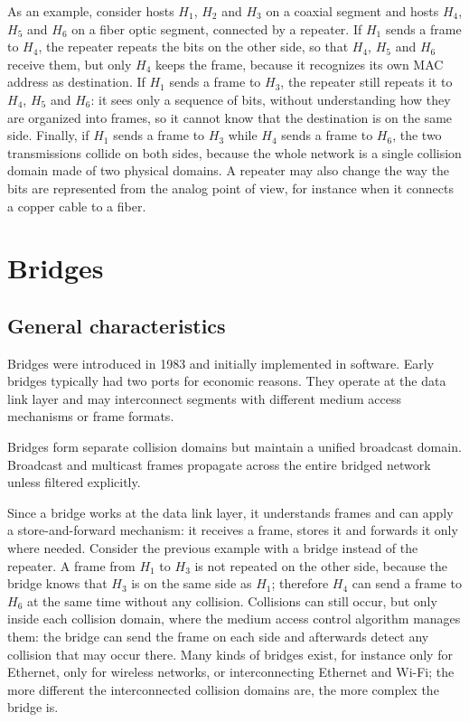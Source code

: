\begin{center}
\end{center}


As an example, consider hosts $H_1$, $H_2$ and $H_3$ on a coaxial segment and hosts $H_4$, $H_5$ and $H_6$ on a fiber optic segment, connected by a repeater. If $H_1$ sends a frame to $H_4$, the repeater repeats the bits on the other side, so that $H_4$, $H_5$ and $H_6$ receive them, but only $H_4$ keeps the frame, because it recognizes its own MAC address as destination. If $H_1$ sends a frame to $H_3$, the repeater still repeats it to $H_4$, $H_5$ and $H_6$: it sees only a sequence of bits, without understanding how they are organized into frames, so it cannot know that the destination is on the same side. Finally, if $H_1$ sends a frame to $H_3$ while $H_4$ sends a frame to $H_6$, the two transmissions collide on both sides, because the whole network is a single collision domain made of two physical domains. A repeater may also change the way the bits are represented from the analog point of view, for instance when it connects a copper cable to a fiber.



\section{Bridges}

\subsection{General characteristics}

Bridges were introduced in 1983 and initially implemented in software. Early bridges typically had two ports for economic reasons. They operate at the data link layer and may interconnect segments with different medium access mechanisms or frame formats.

Bridges form separate collision domains but maintain a unified broadcast domain. Broadcast and multicast frames propagate across the entire bridged network unless filtered explicitly.

Since a bridge works at the data link layer, it understands frames and can apply a store-and-forward mechanism: it receives a frame, stores it and forwards it only where needed. Consider the previous example with a bridge instead of the repeater. A frame from $H_1$ to $H_3$ is not repeated on the other side, because the bridge knows that $H_3$ is on the same side as $H_1$; therefore $H_4$ can send a frame to $H_6$ at the same time without any collision. Collisions can still occur, but only inside each collision domain, where the medium access control algorithm manages them: the bridge can send the frame on each side and afterwards detect any collision that may occur there. Many kinds of bridges exist, for instance only for Ethernet, only for wireless networks, or interconnecting Ethernet and Wi-Fi; the more different the interconnected collision domains are, the more complex the bridge is.

